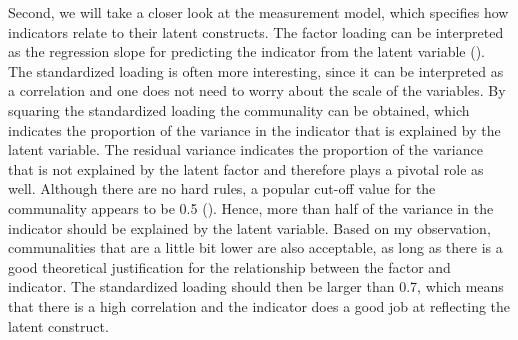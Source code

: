 \documentclass[11pt]{article}
\begin{document}
Second, we will take a closer look at the measurement model, which specifies
how indicators relate to their latent constructs. The factor loading can be
interpreted as the regression slope for predicting the indicator from the latent
variable (\cite{brown2015}). The standardized loading is often more interesting,
since it can be interpreted as a correlation and one does not need to worry
about the scale of the variables. By squaring the standardized loading the
communality can be obtained, which indicates the proportion of the variance in
the indicator that is explained by the latent variable. The residual variance
indicates the proportion of the variance that is not explained by the latent
factor and therefore plays a pivotal role as well. Although there are no hard
rules, a popular cut-off value for the communality appears to be 0.5
(\cite{hair2010}). Hence, more than half of the variance in the indicator should
be explained by the latent variable. Based on my observation, communalities that
are a little bit lower are also acceptable, as long as there is a good
theoretical justification for the relationship between the factor and indicator.
The standardized loading should then be larger than 0.7, which means that there
is a high correlation and the indicator does a good job at reflecting the latent
construct.

\end{document}
